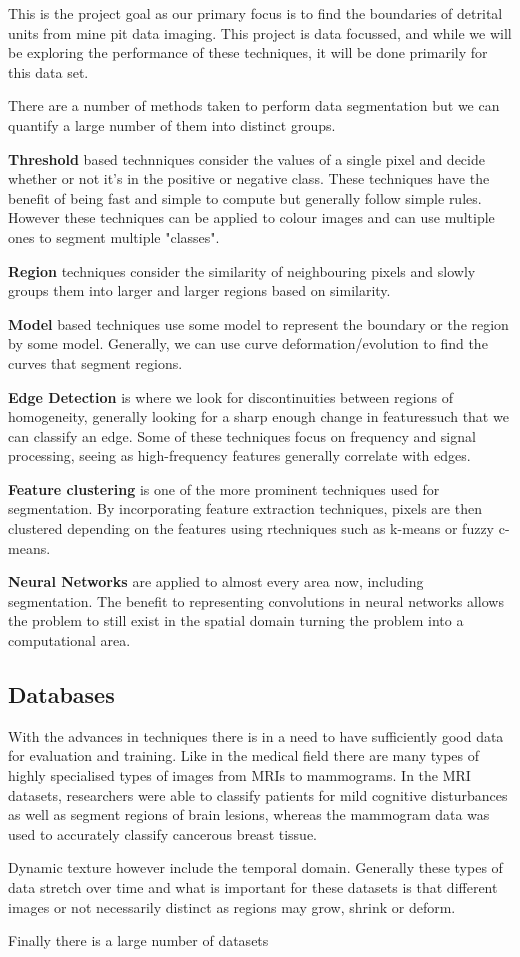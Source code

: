 \documentclass[a4]{article}
\begin{document}
This is the project goal as our primary focus is to find the boundaries of detrital units from mine pit data imaging. This project is data focussed, and while we will be exploring the performance of these techniques, it will be done primarily for this data set.

There are a number of methods taken to perform data segmentation but we can quantify a large number of them into distinct groups.

\textbf{Threshold} based technniques consider the values of a single pixel and decide whether or not it's in the positive or negative class. These techniques have the benefit of being fast and simple to compute but generally follow simple rules. However these techniques can be applied to colour images and can use multiple ones to segment multiple "classes".

\textbf{Region} techniques consider the similarity of neighbouring pixels and slowly groups them into larger and larger regions based on similarity.

\textbf{Model} based techniques use some model to represent the boundary or the region by some model. Generally, we can use curve deformation/evolution to find the curves that segment regions.

\textbf{Edge Detection} is where we look for discontinuities between regions of homogeneity, generally looking for a sharp enough change in featuressuch that we can classify an edge. Some of these techniques focus on frequency and signal processing, seeing as high-frequency features generally correlate with edges.

\textbf{Feature clustering} is one of the more prominent techniques used for segmentation. By incorporating feature extraction techniques, pixels are then clustered depending on the features using rtechniques such as k-means or fuzzy c-means.

\textbf{Neural Networks} are applied to almost every area now, including segmentation. The benefit to representing convolutions in neural networks allows the problem to still exist in the spatial domain turning the problem into a computational area.

\subsection*{Databases}
With the advances in techniques there is in a need to have sufficiently good data for evaluation and training. Like in the medical field there are many types of highly specialised types of images from MRIs to mammograms. In the MRI datasets, researchers were able to classify patients for mild cognitive disturbances as well as segment regions of brain lesions, whereas the mammogram data was used to accurately classify cancerous breast tissue. 

Dynamic texture however include the temporal domain. Generally these types of data stretch over time and what is important for these datasets is that different images or not necessarily distinct as regions may grow, shrink or deform.

Finally there is a large number of datasets 
\end{document}
